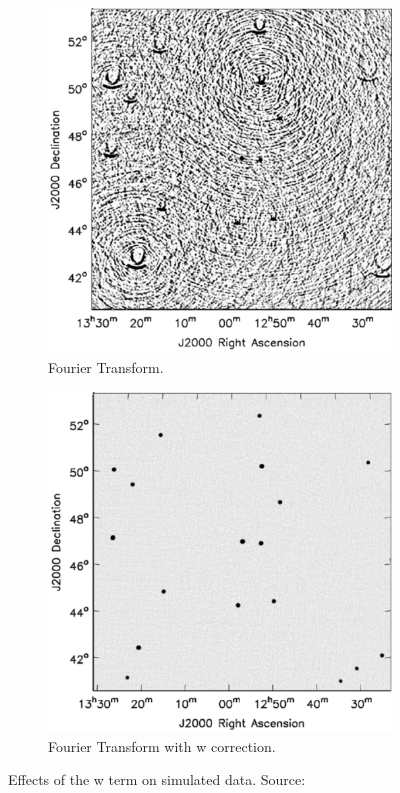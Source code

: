 \begin{figure}[h]
	\centering
	\begin{subfigure}[b]{0.45\linewidth}
		\includegraphics[width=\linewidth]{./chapters/03.radio/w-no-correction.png}
		\caption{Fourier Transform.}
		\label{results:g55:nrao:rec}
	\end{subfigure}
	\begin{subfigure}[b]{0.45\linewidth}
		\includegraphics[width=\linewidth]{./chapters/03.radio/w-correction.png}
		\caption{Fourier Transform with w correction.}
		\label{results:g55:nrao:dirty}
	\end{subfigure}
	\caption{Effects of the w term on simulated data. Source: \cite{cornwell2008noncoplanar}}
	\label{results:g55:nrao}
\end{figure}


